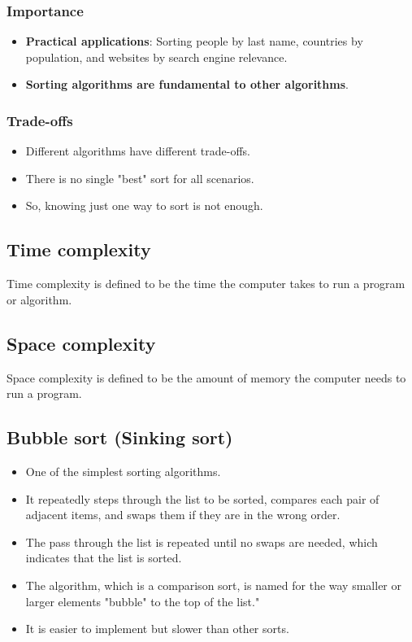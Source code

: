 \documentclass[11pt]{article}
\begin{document}
\subsubsection{Importance}
\label{sec:orgd72ca92}
\begin{itemize}
\item \textbf{Practical applications}: Sorting people by last name, countries by population, and websites by search engine relevance.
\item \textbf{Sorting algorithms are fundamental to other algorithms}.
\end{itemize}
\subsubsection{Trade-offs}
\label{sec:org61b3161}
\begin{itemize}
\item Different algorithms have different trade-offs.
\item There is no single "best" sort for all scenarios.
\item So, knowing just one way to sort is not enough.
\end{itemize}
\subsection{Time complexity}
\label{sec:orgbc19b77}
Time complexity is defined to be the time the computer takes to run a program or algorithm.
\subsection{Space complexity}
\label{sec:org1448646}
Space complexity is defined to be the amount of memory the computer needs to run a program.
\subsection{Bubble sort (Sinking sort)}
\label{sec:org4c977ad}
\begin{itemize}
\item One of the simplest sorting algorithms.
\item It repeatedly steps through the list to be sorted, compares each pair of adjacent items, and swaps them if they are in the wrong order.
\item The pass through the list is repeated until no swaps are needed, which indicates that the list is sorted.
\item The algorithm, which is a comparison sort, is named for the way smaller or larger elements "bubble" to the top of the list."
\item It is easier to implement but slower than other sorts.
\end{itemize}
\end{document}
